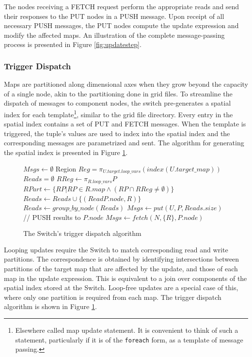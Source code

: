 The nodes receiving a FETCH request perform the appropriate reads and send their responses to the PUT nodes in a PUSH message.  Upon receipt of all necessary PUSH messages, the PUT nodes compute the update expression and modify the affected maps.  An illustration of the complete message-passing process is presented in Figure \ref{fig:updatestep}.  

\subsubsection{Trigger Dispatch}
Maps are partitioned along dimensional axes when they grow beyond the capacity of a single node, akin to the partitioning done in grid files\cite{318586}.  To streamline the dispatch of messages to component nodes, the switch pre-generates a spatial index for each template\footnote{Elsewhere called map update statement. It is convenient to think of such a statement, particularly if it is of the {\tt foreach} form, as a template of message passing.}, similar to the grid file directory.  Every entry in the spatial index contains a set of PUT and FETCH messages.  When the template is triggered, the tuple's values are used to index into the spatial index and the corresponding messages are parametrized and sent.  The algorithm for generating the spatial index is presented in Figure \ref{alg:dispatch}.

\begin{figure}
\begin{algorithmic}[1]
\STATE $Msgs \leftarrow \emptyset$
	\STATE Region $Reg = \pi_{U.target.loop\_vars} \left(index(U.target\_map)\right)$
		\STATE $Reads = \emptyset$
			\STATE $RReg \leftarrow \pi_{R.loop\_vars} P$
			\STATE $RPart \leftarrow \{RP | RP\in R.map \wedge (RP \cap RReg \neq \emptyset)\}$
			\STATE $Reads \leftarrow Reads \cup \{(ReadP.node, R)\}$
		\ENDFOR
		\STATE $Reads \leftarrow group\_by\_node(Reads)$
		\STATE $Msgs \leftarrow put(U, P, Reads.size)$
		  \STATE // PUSH results to $P.node$
			\STATE $Msgs \leftarrow fetch(N, \{R\}, P.node)$
		\ENDFOR
	\ENDFOR
\ENDFOR
\end{algorithmic}
\caption{The Switch's trigger dispatch algorithm}
\label{alg:dispatch}
\end{figure}

Looping updates require the Switch to match corresponding read and write partitions.  The correspondence is obtained by identifying intersections between partitions of the target map that are affected by the update, and those of each map in the update expression.  This is equivalent to a join over components of the spatial index stored at the Switch.  Loop-free updates are a special case of this, where only one partition is required from each map.  The trigger dispatch algorithm is shown in Figure \ref{alg:dispatch}.


